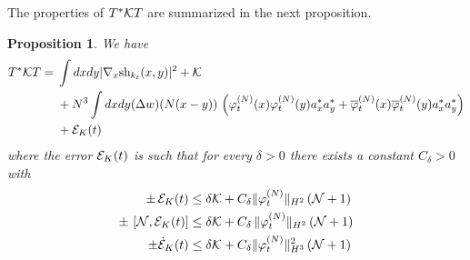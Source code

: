 \documentclass[11pt,a4paper]{article}
\newtheorem{proposition}[thm]{Proposition}
\newcommand{\cE}{{\cal E}}
\newcommand{\cK}{{\cal K}}
\newcommand{\cN}{{\cal N}}
\begin{document}
The properties of $T^* \cK T$ are summarized in the next proposition. 
\begin{proposition}\label{prop:TKT}
We have
\begin{equation}\label{eq:pr-K}
\begin{split}
T^* \cK T = \; &  \int dx dy | \nabla_x \text{sh}_{k_t} (x,y) |^2 + \cK  \\
&+ N^3 \int dx dy (\Delta w) (N (x-y)) \, \left(\varphi_t^{(N)} (x) \varphi_t^{(N)} (y)  a_x^* a^*_y + \overline{\varphi}_t^{(N)} (x) \overline{\varphi}_t^{(N)} (y)  a_x^* a^*_y  \right) \\
&+ \cE_K (t) 
\end{split} \end{equation}
where the error $\cE_K (t)$ is such that for every $\delta > 0$ there exists a constant $C_\delta > 0$ with 
\begin{equation}\label{eq:TKT-cl} 
\begin{split} 
\pm \, \cE_K (t) &\leq \delta \cK + C_\delta \| \varphi_t^{(N)} \|_{H^2} \, (\cN + 1) \\
\pm \, \left[ \cN , \cE_K (t) \right] &\leq \delta \cK + C_\delta \, \| \varphi_t^{(N)} \|_{H^2} \, (\cN + 1) \\
\pm \dot{\cE}_K (t) &\leq \delta \cK + C_\delta \| \varphi_t^{(N)} \|^2_{H^3} \,  (\cN+1) 
\end{split}
\end{equation}
\end{proposition}
\end{document}
